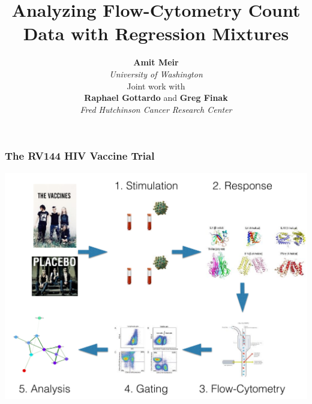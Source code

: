 \documentclass{beamer}
\makeatletter
\def\maxwidth{ %
  \ifdim\Gin@nat@width>\linewidth
    \linewidth
  \else
    \Gin@nat@width
  \fi
}
\theoremstyle{definition}
\makeatother
\begin{document}
\title{\LARGE{Analyzing Flow-Cytometry Count Data with Regression Mixtures}}

\author{\large{\textbf{Amit Meir}} \\ \emph{University of Washington} \\ \vspace{1 cm} Joint work with \\ \vspace{0.1 cm} \textbf{Raphael Gottardo} and \textbf{Greg Finak} 
\\ \emph{Fred Hutchinson Cancer Research Center}}


\vspace{1 cm}


\begin{frame}[plain]
  \titlepage
\end{frame}


\begin{frame}
\frametitle{The RV144 HIV Vaccine Trial}
\begin{center}
\includegraphics[width=\maxwidth]{figures/flowslide}
\end{center}
\end{frame}

\end{document}

